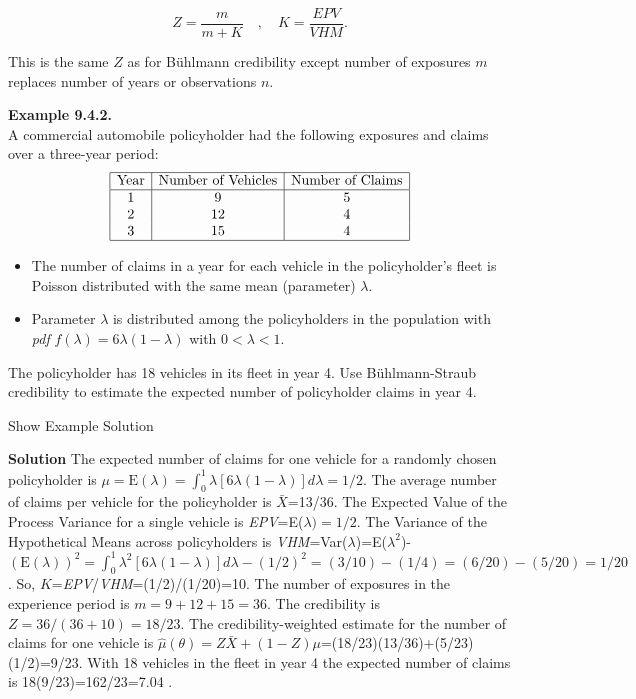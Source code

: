 \documentclass[]{book}
\providecommand{\tightlist}{%
  \setlength{\itemsep}{0pt}\setlength{\parskip}{0pt}}
\theoremstyle{definition}
\theoremstyle{definition}
\theoremstyle{definition}
\theoremstyle{remark}
\begin{document}
\begin{equation}
Z=\frac{m}{m+K} \quad , \quad K =\frac{EPV}{VHM}. 
\label{eq:bsZ} 
\end{equation}

This is the same \(Z\) as for Bühlmann credibility except number of
exposures \(m\) replaces number of years or observations \(n\).

\textbf{Example 9.4.2.}\\
A commercial automobile policyholder had the following exposures and
claims over a three-year period: \[\begin{matrix}
\begin{array}{|c|c|c|}
\hline
\text{Year} & \text{Number of Vehicles} & \text{Number of Claims} \\
\hline
1 &   9 &  5  \\
2 & 12 &  4  \\  
3 & 15 &  4  \\              
\hline
\end{array}
\end{matrix}\]

\begin{itemize}
\tightlist
\item
  The number of claims in a year for each vehicle in the policyholder's
  fleet is Poisson distributed with the same mean (parameter)
  \(\lambda\).
\item
  Parameter \(\lambda\) is distributed among the policyholders in the
  population with \emph{pdf} \(f(\lambda)=6\lambda(1-\lambda)\) with
  \(0<\lambda<1\).
\end{itemize}

The policyholder has 18 vehicles in its fleet in year 4. Use
Bühlmann-Straub credibility to estimate the expected number of
policyholder claims in year 4.

Show Example Solution

\hypertarget{toggleExampleCred.4.2}{}
\textbf{Solution} The expected number of claims for one vehicle for a
randomly chosen policyholder is
\(\mu=\mathrm{E}(\lambda)=\int_{0}^{1} \lambda[6\lambda(1-\lambda)] d\lambda=1/2\).
The average number of claims per vehicle for the policyholder is
\(\bar{X}\)=13/36. The Expected Value of the Process Variance for a
single vehicle is \emph{EPV}=E(\(\lambda)=1/2\). The Variance of the
Hypothetical Means across policyholders is
\emph{VHM}=Var(\(\lambda\))=E(\(\lambda^2\))-\((\mathrm{E}(\lambda))^2=\int_{0}^{1} \lambda^2[6\lambda(1-\lambda)] d\lambda-(1/2)^2=(3/10)-(1/4)=(6/20)-(5/20)=1/20\).
So, \(K\)=\emph{EPV}/\emph{VHM}=(1/2)/(1/20)=10. The number of exposures
in the experience period is \(m=9+12+15=36\). The credibility is
\(Z=36/(36+10)=18/23\). The credibility-weighted estimate for the number
of claims for one vehicle is
\(\hat{\mu}(\theta)=Z\bar{X}+(1-Z)\mu\)=(18/23)(13/36)+(5/23)(1/2)=9/23.
With 18 vehicles in the fleet in year 4 the expected number of claims is
18(9/23)=162/23=7.04 .
\end{document}
